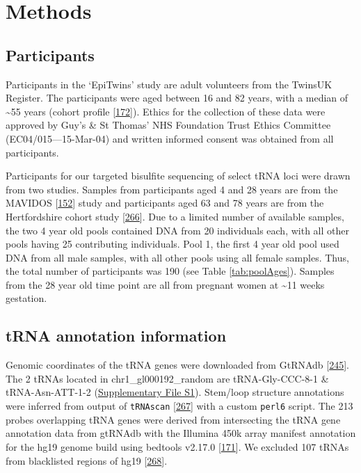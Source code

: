 \documentclass[
]{book}
\begin{document}
\newpage

\hypertarget{Methods}{%
\section{Methods}\label{Methods}}

\hypertarget{participants-1}{%
\subsection{Participants}\label{participants-1}}

Participants in the `EpiTwins' study are adult volunteers from the TwinsUK Register.
The participants were aged between 16 and 82 years, with a median of \textasciitilde55 years (cohort profile {[}\protect\hyperlink{ref-Moayyeri2013}{172}{]}).
Ethics for the collection of these data were approved by Guy's \& St Thomas' NHS Foundation Trust Ethics Committee (EC04/015---15-Mar-04) and written informed consent was obtained from all participants.

Participants for our targeted bisulfite sequencing of select tRNA loci were drawn from two studies.
Samples from participants aged 4 and 28 years are from the MAVIDOS {[}\protect\hyperlink{ref-Harvey2012a}{152}{]} study and participants aged 63 and 78 years are from the Hertfordshire cohort study {[}\protect\hyperlink{ref-Syddall2005}{266}{]}.
Due to a limited number of available samples, the two 4 year old pools contained DNA from 20 individuals each, with all other pools having 25 contributing individuals.
Pool 1, the first 4 year old pool used DNA from all male samples, with all other pools using all female samples.
Thus, the total number of participants was 190 (see Table \ref{tab:poolAges}).
Samples from the 28 year old time point are all from pregnant women at \textasciitilde11 weeks gestation.

\hypertarget{tRNAanno}{%
\subsection{tRNA annotation information}\label{tRNAanno}}

Genomic coordinates of the tRNA genes were downloaded from GtRNAdb {[}\protect\hyperlink{ref-Chan2009}{245}{]}.
The 2 tRNAs located in chr1\_gl000192\_random are tRNA-Gly-CCC-8-1 \& tRNA-Asn-ATT-1-2 (\href{./Supplementary_Files/hg19-tRNAs.bed}{Supplementary File S1}).
Stem/loop structure annotations were inferred from output of \texttt{tRNAscan} {[}\protect\hyperlink{ref-Lowe2016}{267}{]} with a custom \texttt{perl6} script.
The 213 probes overlapping tRNA genes were derived from intersecting the tRNA gene annotation data from gtRNAdb with the Illumina 450k array manifest annotation for the hg19 genome build using bedtools v2.17.0 {[}\protect\hyperlink{ref-Quinlan2010}{171}{]}.
We excluded 107 tRNAs from blacklisted regions of hg19 {[}\protect\hyperlink{ref-Amemiya2019}{268}{]}.
\end{document}
